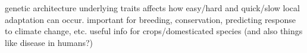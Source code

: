 genetic architecture underlying traits affects how easy/hard and quick/slow local adaptation can occur. important for breeding, conservation, predicting response to climate change, etc.
useful info for crops/domesticated species (and also things like disease in humans?) 

